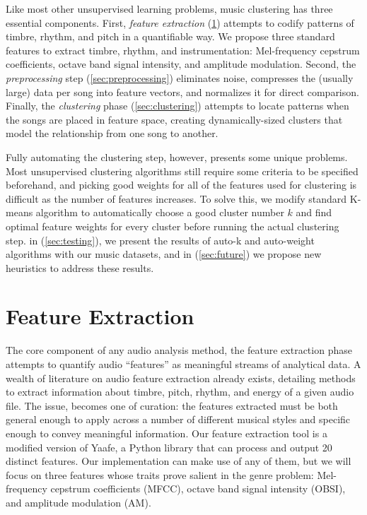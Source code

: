 \documentclass[12pt,twocolumn,titlepage]{article}
\begin{document}
Like most other unsupervised learning problems, music clustering has three essential components. First, \emph{feature extraction} (\ref{sec:feature}) attempts to codify patterns of timbre, rhythm, and pitch in a quantifiable way. We propose three standard features to extract timbre, rhythm, and instrumentation: Mel-frequency cepstrum coefficients, octave band signal intensity, and amplitude modulation. Second, the \emph{preprocessing} step (\ref{sec:preprocessing}) eliminates noise, compresses the (usually large) data per song into feature vectors, and normalizes it for direct comparison. Finally, the \emph{clustering} phase (\ref{sec:clustering}) attempts to locate patterns when the songs are placed in feature space, creating dynamically-sized clusters that model the relationship from one song to another.

Fully automating the clustering step, however, presents some unique problems. Most unsupervised clustering algorithms still require some criteria to be specified beforehand, and picking good weights for all of the features used for clustering is difficult as the number of features increases. To solve this, we modify standard K-means algorithm to automatically choose a good cluster number $k$ and find optimal feature weights for every cluster before running the actual clustering step. in (\ref{sec:testing}), we present the results of auto-k and auto-weight algorithms with our music datasets, and in (\ref{sec:future}) we propose new heuristics to address these results.


\section{Feature Extraction}
\label{sec:feature}

The core component of any audio analysis method, the feature extraction phase attempts to quantify audio ``features'' as meaningful streams of analytical data. A wealth of literature on audio feature extraction already exists, detailing methods to extract information about timbre, pitch, rhythm, and energy of a given audio file. The issue, becomes one of curation: the features extracted must be both general enough to apply across a number of different musical styles and specific enough to convey meaningful information. Our feature extraction tool is a modified version of Yaafe, a Python library that can process and output 20 distinct features. \cite{yaafe} Our implementation can make use of any of them, but we will focus on three features whose traits prove salient in the genre problem: Mel-frequency cepstrum coefficients (MFCC), octave band signal intensity (OBSI), and amplitude modulation (AM). 
\end{document}
